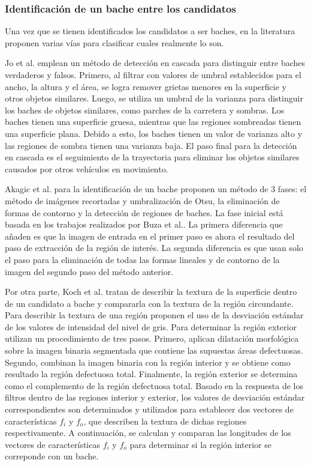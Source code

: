 		\subsubsection{Identificación de un bache entre los candidatos}
		Una vez que se tienen identificados los candidatos a ser baches, en la literatura proponen varias vías para  
		clasificar cuales realmente lo son.

		Jo et al. emplean un método de detección en cascada para distinguir
		entre baches verdaderos y falsos. Primero, al filtrar con valores de umbral establecidos para el ancho, la
		altura y el área, se logra remover grietas menores en la superficie y otros objetos similares. Luego, 
		se utiliza un umbral de la varianza para distinguir los baches de objetos similares, como parches de 
		la carretera y sombras. Los baches tienen una superficie gruesa, mientras que las regiones sombreadas 
		tienen una superficie plana. Debido a esto, los baches tienen un valor de varianza alto y las regiones 
		de sombra tienen una varianza baja. El paso final para la detección en cascada es el seguimiento de 
		la trayectoria para eliminar los objetos similares causados por otros vehículos en movimiento. 
		

		Akagic et al. para la identificación de un bache proponen un método de 3 fases:
		el método de imágenes recortadas y umbralización de Otsu, la eliminación de formas de contorno y la detección 
		de regiones de baches. La fase inicial está basada en los trabajos realizados por  Buza et al..
		La primera diferencia que añaden es que la imagen de entrada en el primer paso es ahora el resultado del paso de extracción 
		de la región de interés. La segunda diferencia es que usan solo el paso para la eliminación de todas las formas lineales y de 
		contorno de la imagen del segundo paso del método anterior.

		Por otra parte, Koch et al. tratan de describir la textura de la superficie dentro de un candidato a bache y 
		compararla con la textura de la región circundante. Para describir la textura de una región proponen el uso de la desviación estándar de 
		los valores de intensidad del nivel de gris. Para determinar la región exterior utilizan un  procedimiento de tres pasos. Primero, 
		aplican dilatación morfológica sobre la imagen binaria segmentada que contiene las supuestas áreas defectuosas. Segundo, combinan la 
		imagen binaria con la región interior y se obtiene como resultado la región defectuosa total. Finalmente, la región exterior se determina 
		como el complemento de la región defectuosa total. Basado en la respuesta de los filtros dentro de las regiones interior y exterior, los 
		valores de desviación estándar correspondientes son determinados y utilizados para establecer dos vectores de características $f_i$ y $f_o$, 
		que describen la textura de dichas regiones respectivamente. A continuación, se calculan y comparan las longitudes de los vectores de 
		características $f_i$ y $f_o$ para determinar si la región interior se correponde con un bache.


